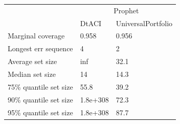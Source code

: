 \begin{tabular}{lll}
\toprule
& \multicolumn{2}{c}{Prophet} \\
& DtACI & UniversalPortfolio \\
\midrule
Marginal coverage & 0.958 & 0.956 \\
Longest err sequence & 4 & 2 \\
Average set size & inf & 32.1 \\
Median set size & 14 & 14.3 \\
75\% quantile set size & 55.8 & 39.2 \\
90\% quantile set size & 1.8e+308 & 72.3 \\
95\% quantile set size & 1.8e+308 & 87.7 \\
\bottomrule
\end{tabular}

